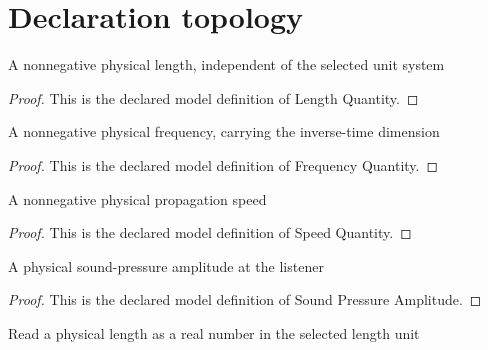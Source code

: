\section{Declaration topology}
\begin{definition}
  \label{def:physics:phyx-mini-0314:phyxminiproblems-problemphyxmini0314-lengthquantity}
  A nonnegative physical length, independent of the selected unit system
\end{definition}
\begin{proof}
  This is the declared model definition of Length Quantity.
\end{proof}
\begin{definition}
  \label{def:physics:phyx-mini-0314:phyxminiproblems-problemphyxmini0314-frequencyquantity}
  A nonnegative physical frequency, carrying the inverse-time dimension
\end{definition}
\begin{proof}
  This is the declared model definition of Frequency Quantity.
\end{proof}
\begin{definition}
  \label{def:physics:phyx-mini-0314:phyxminiproblems-problemphyxmini0314-speedquantity}
  A nonnegative physical propagation speed
\end{definition}
\begin{proof}
  This is the declared model definition of Speed Quantity.
\end{proof}
\begin{definition}
  \label{def:physics:phyx-mini-0314:phyxminiproblems-problemphyxmini0314-soundpressureamplitude}
  A physical sound-pressure amplitude at the listener
\end{definition}
\begin{proof}
  This is the declared model definition of Sound Pressure Amplitude.
\end{proof}
\begin{definition}
  \label{def:physics:phyx-mini-0314:phyxminiproblems-problemphyxmini0314-lengthreadout}
  Read a physical length as a real number in the selected length unit
\end{definition}
